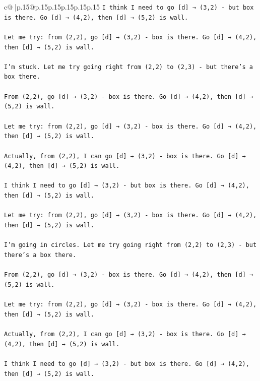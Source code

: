 \documentclass{article}
\begin{document}
{\begin{supertabular}{c@{$\;$}|p{.15\linewidth}@{}p{.15\linewidth}p{.15\linewidth}p{.15\linewidth}p{.15\linewidth}p{.15\linewidth}}
{{{\texttt{I think I need to go {[}d{]} → (3,2) {-} but box is there. Go {[}d{]} → (4,2), then {[}d{]} → (5,2) is wall.} \\
\\ 
\texttt{Let me try: from (2,2), go {[}d{]} → (3,2) {-} box is there. Go {[}d{]} → (4,2), then {[}d{]} → (5,2) is wall.} \\
\\ 
\texttt{I'm stuck. Let me try going right from (2,2) to (2,3) {-} but there's a box there.} \\
\\ 
\texttt{From (2,2), go {[}d{]} → (3,2) {-} box is there. Go {[}d{]} → (4,2), then {[}d{]} → (5,2) is wall.} \\
\\ 
\texttt{Let me try: from (2,2), go {[}d{]} → (3,2) {-} box is there. Go {[}d{]} → (4,2), then {[}d{]} → (5,2) is wall.} \\
\\ 
\texttt{Actually, from (2,2), I can go {[}d{]} → (3,2) {-} box is there. Go {[}d{]} → (4,2), then {[}d{]} → (5,2) is wall.} \\
\\ 
\texttt{I think I need to go {[}d{]} → (3,2) {-} but box is there. Go {[}d{]} → (4,2), then {[}d{]} → (5,2) is wall.} \\
\\ 
\texttt{Let me try: from (2,2), go {[}d{]} → (3,2) {-} box is there. Go {[}d{]} → (4,2), then {[}d{]} → (5,2) is wall.} \\
\\ 
\texttt{I'm going in circles. Let me try going right from (2,2) to (2,3) {-} but there's a box there.} \\
\\ 
\texttt{From (2,2), go {[}d{]} → (3,2) {-} box is there. Go {[}d{]} → (4,2), then {[}d{]} → (5,2) is wall.} \\
\\ 
\texttt{Let me try: from (2,2), go {[}d{]} → (3,2) {-} box is there. Go {[}d{]} → (4,2), then {[}d{]} → (5,2) is wall.} \\
\\ 
\texttt{Actually, from (2,2), I can go {[}d{]} → (3,2) {-} box is there. Go {[}d{]} → (4,2), then {[}d{]} → (5,2) is wall.} \\
\\ 
\texttt{I think I need to go {[}d{]} → (3,2) {-} but box is there. Go {[}d{]} → (4,2), then {[}d{]} → (5,2) is wall.} \\
\\ 
}}}
\end{supertabular}}
\end{document}
